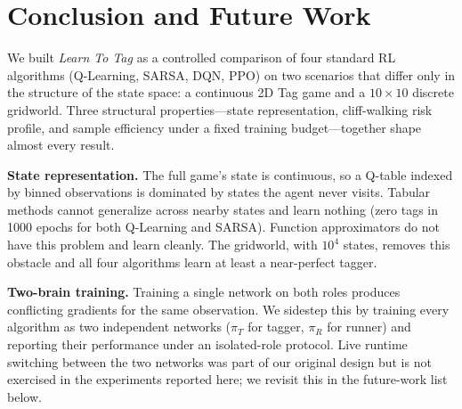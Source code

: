 \documentclass[conference]{IEEEtran}
\begin{document}
\section{Conclusion and Future Work}\label{sec:conclusion}

We built \textit{Learn To Tag} as a controlled comparison of four
standard RL algorithms (Q-Learning, SARSA, DQN, PPO) on two scenarios
that differ only in the structure of the state space: a continuous
2D Tag game and a $10{\times}10$ discrete gridworld. Three structural
properties---state representation, cliff-walking risk profile, and
sample efficiency under a fixed training budget---together shape
almost every result.

\textbf{State representation.} The full game's state is continuous, so
a Q-table indexed by binned observations is dominated by states the
agent never visits. Tabular methods cannot generalize across nearby
states and learn nothing (zero tags in 1000 epochs for both Q-Learning
and SARSA). Function approximators do not have this problem and learn
cleanly. The gridworld, with $10^4$ states, removes this obstacle and
all four algorithms learn at least a near-perfect tagger.

\textbf{Two-brain training.} Training a single network on both roles
produces conflicting gradients for the same observation. We sidestep
this by training every algorithm as two independent networks
($\pi_T$ for tagger, $\pi_R$ for runner) and reporting their
performance under an isolated-role protocol. Live runtime switching
between the two networks was part of our original design but is not
exercised in the experiments reported here; we revisit this in the
future-work list below.
\end{document}
